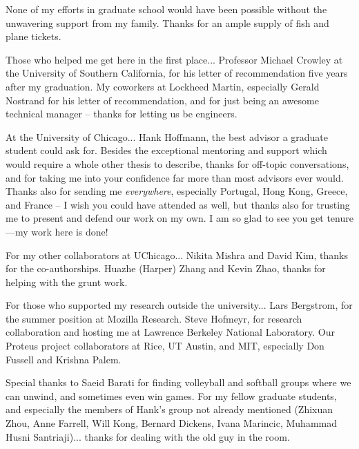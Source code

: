None of my efforts in graduate school would have been possible without the unwavering support from my family.
Thanks for an ample supply of fish and plane tickets.

Those who helped me get here in the first place...
Professor Michael Crowley at the University of Southern California, for his letter of recommendation five years after my graduation.
My coworkers at Lockheed Martin, especially Gerald Nostrand for his letter of recommendation, and for just being an awesome technical manager -- thanks for letting us be engineers.

At the University of Chicago... Hank Hoffmann, the best advisor a graduate student could ask for.
Besides the exceptional mentoring and support which would require a whole other thesis to describe, thanks for off-topic conversations, and for taking me into your confidence far more than most advisors ever would.
Thanks also for sending me \emph{everywhere}, especially Portugal, Hong Kong, Greece, and France -- I wish you could have attended as well, but thanks also for trusting me to present and defend our work on my own.
I am so glad to see you get tenure---my work here is done!

For my other collaborators at UChicago...
Nikita Mishra and David Kim, thanks for the co-authorships.
Huazhe (Harper) Zhang and Kevin Zhao, thanks for helping with the grunt work.

For those who supported my research outside the university...
Lars Bergstrom, for the summer position at Mozilla Research.
Steve Hofmeyr, for research collaboration and hosting me at Lawrence Berkeley National Laboratory.
Our Proteus project collaborators at Rice, UT Austin, and MIT, especially Don Fussell and Krishna Palem.

Special thanks to Saeid Barati for finding volleyball and softball groups where we can unwind, and sometimes even win games.
For my fellow graduate students, and especially the members of Hank's group not already mentioned (Zhixuan Zhou, Anne Farrell, Will Kong, Bernard Dickens, Ivana Marincic, Muhammad Husni Santriaji)... thanks for dealing with the old guy in the room.
